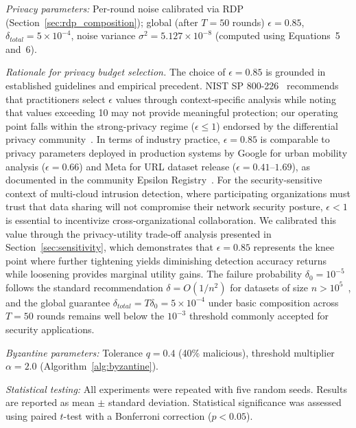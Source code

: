 \documentclass{ieeeaccess}
\theoremstyle{plain}
\theoremstyle{definition}
\theoremstyle{remark}
\begin{document}
\textit{Privacy parameters:} Per-round noise calibrated via RDP (Section~\ref{sec:rdp_composition}); global (after $T = 50$ rounds) $\epsilon = 0.85$, $\delta_{total} = 5 \times 10^{-4}$, noise variance $\sigma^2 = 5.127 \times 10^{-8}$ (computed using Equations~5 and~6).

\textit{Rationale for privacy budget selection.} The choice of $\epsilon = 0.85$ is grounded in established guidelines and empirical precedent. NIST SP 800-226~\cite{nist2025} recommends that practitioners select $\epsilon$ values through context-specific analysis while noting that values exceeding 10 may not provide meaningful protection; our operating point falls within the strong-privacy regime ($\epsilon \leq 1$) endorsed by the differential privacy community~\cite{dwork2014}. In terms of industry practice, $\epsilon = 0.85$ is comparable to privacy parameters deployed in production systems by Google for urban mobility analysis ($\epsilon = 0.66$) and Meta for URL dataset release ($\epsilon = 0.41$--$1.69$), as documented in the community Epsilon Registry~\cite{dwork2019expose}. For the security-sensitive context of multi-cloud intrusion detection, where participating organizations must trust that data sharing will not compromise their network security posture, $\epsilon < 1$ is essential to incentivize cross-organizational collaboration. We calibrated this value through the privacy-utility trade-off analysis presented in Section~\ref{sec:sensitivity}, which demonstrates that $\epsilon = 0.85$ represents the knee point where further tightening yields diminishing detection accuracy returns while loosening provides marginal utility gains. The failure probability $\delta_0 = 10^{-5}$ follows the standard recommendation $\delta = O(1/n^2)$ for datasets of size $n > 10^5$~\cite{dwork2014}, and the global guarantee $\delta_{total} = T \delta_0 = 5 \times 10^{-4}$ under basic composition across $T = 50$ rounds remains well below the $10^{-3}$ threshold commonly accepted for security applications.

\textit{Byzantine parameters:} Tolerance $q = 0.4$ (40\% malicious), threshold multiplier $\alpha = 2.0$ (Algorithm~\ref{alg:byzantine}).

\textit{Statistical testing:} All experiments were repeated with five random seeds. Results are reported as mean $\pm$ standard deviation. Statistical significance was assessed using paired $t$-test with a Bonferroni correction ($p < 0.05$).


\end{document}
